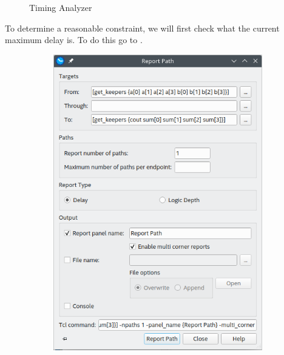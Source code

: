 \documentclass[12pt]{betterjournal}
\begin{document}
\begin{minipage}[t][0.5\textheight][t]{\linewidth}
\begin{figure}[H]
    \caption{Timing Analyzer}
\end{figure}
\end{minipage}
\begin{minipage}[htbp!]{\linewidth}
\noindent
To determine a reasonable constraint, we will first check what the current maximum delay is. To do this go to . 
    \begin{minipage}[ht!]{0.5\linewidth}
    \begin{figure}[H]
    \centering
    \begin{subfigure}{\linewidth}
        \includegraphics[width=\linewidth]{reportpath.png}

\end{subfigure}
\end{figure}
\end{minipage}
\end{minipage}
\end{document}
